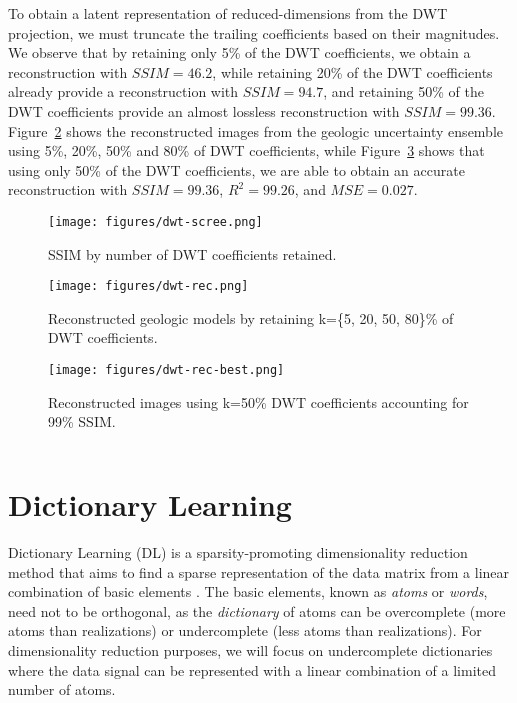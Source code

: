 \documentclass[a4paper,fleqn,12pt]{article}
\begin{document}
To obtain a latent representation of reduced-dimensions from the DWT projection, we must truncate the trailing coefficients based on their magnitudes. We observe that by retaining only 5\% of the DWT coefficients, we obtain a reconstruction with $SSIM=46.2$, while retaining 20\% of the DWT coefficients already provide a reconstruction with $SSIM=94.7$, and retaining 50\% of the DWT coefficients provide an almost lossless reconstruction with $SSIM=99.36$. Figure~\ref{fig:dwt-rec} shows the reconstructed images from the geologic uncertainty ensemble using 5\%, 20\%, 50\% and 80\% of DWT coefficients, while Figure~\ref{fig:dwt-rec-best} shows that using only 50\% of the DWT coefficients, we are able to obtain an accurate reconstruction with $SSIM=99.36$, $R^2=99.26$, and $MSE=0.027$.

\begin{figure}[H]
    \centering
    \texttt{[image: figures/dwt-scree.png]}
    \caption{SSIM by number of DWT coefficients retained.}
    \label{fig:dwt-scree}
\end{figure}


\begin{figure}[H]
    \centering
    \texttt{[image: figures/dwt-rec.png]}
    \caption{Reconstructed geologic models by retaining k=\{5, 20, 50, 80\}\% of DWT coefficients.}
    \label{fig:dwt-rec}
\end{figure}

\begin{figure}[H]
    \centering
    \texttt{[image: figures/dwt-rec-best.png]}
    \caption{Reconstructed images using k=50\% DWT coefficients accounting for 99\% SSIM.}
    \label{fig:dwt-rec-best}
\end{figure}

\inputminted[frame=lines, framesep=2mm, baselinestretch=1.2, 
             bgcolor=LightGray, fontsize=\footnotesize, linenos]
{python}{codes/dwt.py}


\pagebreak
\section*{Dictionary Learning}
Dictionary Learning (DL) is a sparsity-promoting dimensionality reduction method that aims to find a sparse representation of the data matrix from a linear combination of basic elements \cite{tovsic2011dictionary, mairal2008supervised}. The basic elements, known as \emph{atoms} or \emph{words}, need not to be orthogonal, as the \emph{dictionary} of atoms can be overcomplete (more atoms than realizations) or undercomplete (less atoms than realizations). For dimensionality reduction purposes, we will focus on undercomplete dictionaries where the data signal can be represented with a linear combination of a limited number of atoms.
\end{document}
